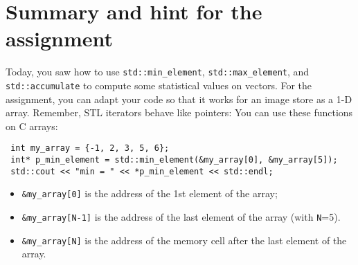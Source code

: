 \documentclass[english,a4paper,12pt,oneside]{article}
\begin{document}
% 
% 

\section{Summary and hint for the assignment}

Today, you saw how to use
\verb+std::min_element+, \verb+std::max_element+, and \verb+std::accumulate+ to compute some statistical values on vectors. For the assignment, you can adapt your code so that it works for an image store as a 1-D array. Remember, STL iterators behave like pointers: You can use these functions on C arrays:

\begin{verbatim}
 int my_array = {-1, 2, 3, 5, 6};
 int* p_min_element = std::min_element(&my_array[0], &my_array[5]);
 std::cout << "min = " << *p_min_element << std::endl;
\end{verbatim}

\begin{itemize}
 \item \verb+&my_array[0]+ is the address of the 1st element of the array;
 \item \verb+&my_array[N-1]+ is the address of the last element of the array (with \verb+N+=5).
 \item \verb+&my_array[N]+ is the address of the memory cell after the last element of the array.
\end{itemize}
\end{document}

